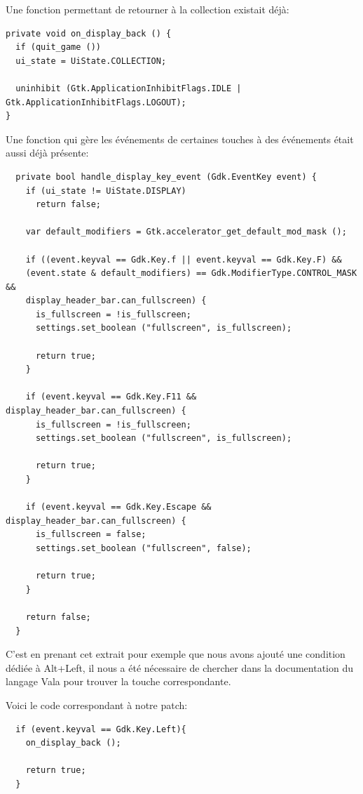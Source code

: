 \documentclass[12pt]{report}
\begin{document}
Une fonction permettant de retourner à la collection existait déjà:

\begin{verbatim}
private void on_display_back () {
  if (quit_game ())
  ui_state = UiState.COLLECTION;

  uninhibit (Gtk.ApplicationInhibitFlags.IDLE | Gtk.ApplicationInhibitFlags.LOGOUT);
}
\end{verbatim}

Une fonction qui gère les événements de certaines touches à des événements
était aussi déjà présente:

\begin{verbatim}
  private bool handle_display_key_event (Gdk.EventKey event) {
    if (ui_state != UiState.DISPLAY)
      return false;

    var default_modifiers = Gtk.accelerator_get_default_mod_mask ();

    if ((event.keyval == Gdk.Key.f || event.keyval == Gdk.Key.F) &&
    (event.state & default_modifiers) == Gdk.ModifierType.CONTROL_MASK &&
    display_header_bar.can_fullscreen) {
      is_fullscreen = !is_fullscreen;
      settings.set_boolean ("fullscreen", is_fullscreen);

      return true;
    }

    if (event.keyval == Gdk.Key.F11 && display_header_bar.can_fullscreen) {
      is_fullscreen = !is_fullscreen;
      settings.set_boolean ("fullscreen", is_fullscreen);

      return true;
    }

    if (event.keyval == Gdk.Key.Escape && display_header_bar.can_fullscreen) {
      is_fullscreen = false;
      settings.set_boolean ("fullscreen", false);

      return true;
    }
    
    return false;
  }
\end{verbatim}

C'est en prenant cet extrait pour exemple que nous avons ajouté une
condition dédiée à Alt+Left, il nous a été nécessaire de chercher dans
la documentation du langage Vala pour trouver la touche
correspondante.

Voici le code correspondant à notre patch:

\begin{verbatim}
  if (event.keyval == Gdk.Key.Left){			
    on_display_back ();
    
    return true;
  }
\end{verbatim}
\end{document}
